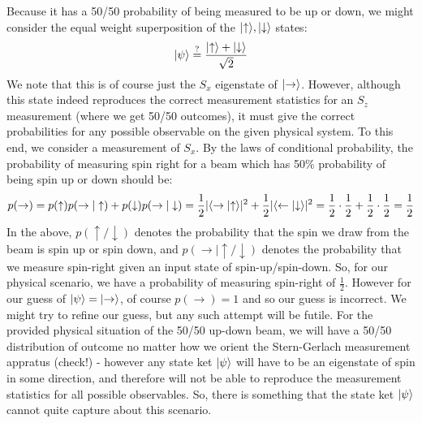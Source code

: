Because it has a 50/50 probability of being measured to be up or down, we might consider the equal weight superposition of the $\lvert \uparrow \rangle, \lvert \downarrow \rangle$ states:
\begin{equation}\label{eq-unpolarizedguess}
    \lvert \psi \rangle \stackrel{?}{=} \frac{\lvert \uparrow \rangle + \lvert \downarrow \rangle}{\sqrt{2}}
\end{equation}
We note that this is of course just the $S_x$ eigenstate of $\lvert \rightarrow \rangle$. However, although this state indeed reproduces the correct measurement statistics for an $S_z$ measurement (where we get 50/50 outcomes), it must give the correct probabilities for any possible observable on the given physical system. To this end, we consider a measurement of $S_x$. By the laws of conditional probability, the probability of measuring spin right for a beam which has 50\% probability of being spin up or down should be:
\begin{equation}
    p(\rightarrow) = p(\uparrow)p(\rightarrow \vert \uparrow) + p(\downarrow)p(\rightarrow \vert \downarrow) = \frac{1}{2}\lvert \langle \rightarrow \lvert \uparrow \rangle \rvert^2 + \frac{1}{2}\lvert \langle \leftarrow \lvert \downarrow \rangle \rvert^2 = \frac{1}{2}\cdot \frac{1}{2} + \frac{1}{2} \cdot \frac{1}{2} = \frac{1}{2}
\end{equation}
In the above, $p(\uparrow/\downarrow)$ denotes the probability that the spin we draw from the beam is spin up or spin down, and $p(\rightarrow \vert \uparrow/\downarrow)$ denotes the probability that we measure spin-right given an input state of spin-up/spin-down. So, for our physical scenario, we have a probability of measuring spin-right of $\frac{1}{2}$. However for our guess of $\lvert \psi \rangle = \lvert \rightarrow \rangle$, of course $p(\rightarrow) = 1$ and so our guess is incorrect. We might try to refine our guess, but any such attempt will be futile. For the provided physical situation of the 50/50 up-down beam, we will have a 50/50 distribution of outcome no matter how we orient the Stern-Gerlach measurement appratus (check!) - however any state ket $\lvert \psi \rangle$ will have to be an eigenstate of spin in some direction, and therefore will not be able to reproduce the measurement statistics for all possible observables. So, there is something that the state ket $\lvert \psi \rangle$ cannot quite capture about this scenario.

